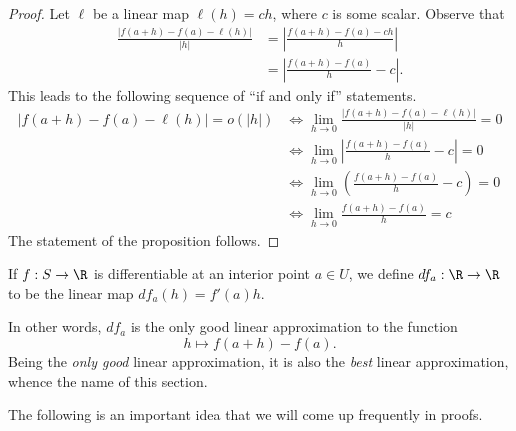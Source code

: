 \begin{proof}
	Let $\ell$ be a linear map $\ell(h) = ch$, where $c$ is some scalar. Observe that
	\[ \begin{aligned} \frac{|f(a+h)-f(a)-\ell(h)|}{|h|} &= \left| \frac{f(a+h)-f(a) - ch}{h} \right| \\
	&= \left| \frac{f(a+h)-f(a)}{h} - c \right|. \end{aligned} \]
	This leads to the following sequence of ``if and only if'' statements. 
	\[ \begin{aligned} |f(a+h)-f(a)-\ell(h)| = o(|h|) &\iff \lim_{h \to 0} \frac{|f(a+h)-f(a)-\ell(h)|}{|h|} = 0 \\
	&\iff \lim_{h \to 0} \left| \frac{f(a+h)-f(a)}{h} - c \right| = 0 \\
	&\iff \lim_{h \to 0} \left( \frac{f(a+h)-f(a)}{h} - c \right) = 0 \\
	&\iff \lim_{h \to 0} \frac{f(a+h)-f(a)}{h} = c \end{aligned} \]
	The statement of the proposition follows. 
\end{proof}

\begin{definition}
	If $f : S \to \R$ is differentiable at an interior point $a \in U$, we define $df_a : \R \to \R$ to be the linear map $df_a(h) = f'(a)h$. 
\end{definition}

In other words, $df_a$ is the only good linear approximation to the function \[ h \mapsto f(a+h)-f(a). \] Being the \emph{only good} linear approximation, it is also the \emph{best} linear approximation, whence the name of this section.

The following is an important idea that we will come up frequently in proofs. 

